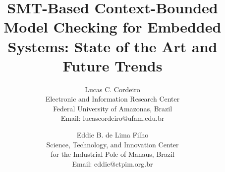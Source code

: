 \documentclass{acm_sen_article}
\begin{document}
%
\title{SMT-Based Context-Bounded Model Checking for Embedded Systems: State of the Art and Future Trends}


\author{Lucas C. Cordeiro \\
Electronic and Information Research Center\\
Federal University of Amazonas, Brazil\\
Email: lucascordeiro@ufam.edu.br
\and
Eddie B. de Lima Filho \\
Science, Technology, and Innovation Center\\ for the Industrial Pole of Manaus, Brazil \\
Email: eddie@ctpim.org.br}


% 
\end{document}
